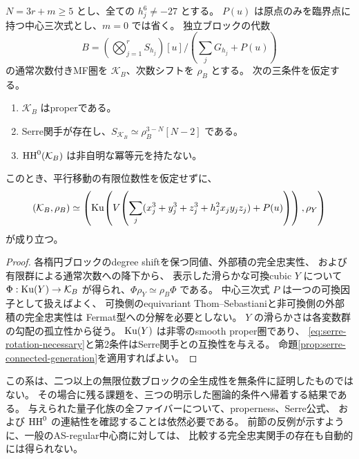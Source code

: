 \begin{corollary}[任意位数の独立ブロックに対する十分条件]
\label{cor:arbitrary-order-conditional-model}
 \(N=3r+m\ge5\) とし、全ての \(h_j^6\ne-27\) とする。
 \(P(u)\) は原点のみを臨界点に持つ中心三次式とし、\(m=0\) では省く。
 独立ブロックの代数
 \[
 B=\left(\bigotimes_{j=1}^rS_{h_j}\right)[u]
     \Big/\left(\sum_jG_{h_j}+P(u)\right)
 \]
 の通常次数付きMF圏を \(\mathcal K_B\)、次数シフトを \(\rho_B\) とする。
 次の三条件を仮定する。
 \begin{enumerate}
 \item \(\mathcal K_B\) はproperである。
 \item Serre関手が存在し、\(S_{\mathcal K_B}\simeq\rho_B^{3-N}[N-2]\) である。
 \item \(\operatorname{HH}^0(\mathcal K_B)\) は非自明な冪等元を持たない。
 \end{enumerate}
 このとき、平行移動の有限位数性を仮定せずに、
 \[
 (\mathcal K_B,\rho_B)\simeq
 \left(\operatorname{Ku}\!\left(V\!\left(\sum_j
 (x_j^3+y_j^3+z_j^3+h_j^2x_jy_jz_j)+P(u)\right)\right),\rho_Y\right)
 \]
 が成り立つ。
\end{corollary}
\begin{proof}
 各楕円ブロックのdegree shiftを保つ同値、外部積の完全忠実性、
 および有限群による通常次数への降下から、
 表示した滑らかな可換cubic \(Y\) について
 \(\Phi:\operatorname{Ku}(Y)\to\mathcal K_B\) が得られ、\(\Phi\rho_Y\simeq\rho_B\Phi\) である。
 中心三次式 \(P\) は一つの可換因子として扱えばよく、
 可換側のequivariant Thom--Sebastianiと非可換側の外部積の完全忠実性は
 Fermat型への分解を必要としない。
 \(Y\) の滑らかさは各変数群の勾配の孤立性から従う。
 \(\operatorname{Ku}(Y)\) は非零のsmooth proper圏であり、
 \eqref{eq:serre-rotation-necessary}と第2条件はSerre関手との互換性を与える。
 命題\ref{prop:serre-connected-generation}を適用すればよい。
\end{proof}

\begin{remark}[この十分条件の検証状態]
 この系は、二つ以上の無限位数ブロックの全生成性を無条件に証明したものではない。
 その場合に残る課題を、三つの明示した圏論的条件へ帰着する結果である。
 与えられた量子化族の全ファイバーについて、properness、Serre公式、
 および \(\operatorname{HH}^0\) の連結性を確認することは依然必要である。
 前節の反例が示すように、一般のAS-regular中心商に対しては、
 比較する完全忠実関手の存在も自動的には得られない。
\end{remark}
